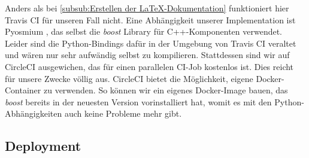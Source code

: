 Anders als bei \ref{subsub:Erstellen der LaTeX-Dokumentation} funktioniert hier Travis CI für unseren Fall nicht. Eine Abhängigkeit unserer Implementation ist Pyosmium \cite{pyosmium}, das selbst die \emph{boost} Library für C++-Komponenten verwendet. Leider sind die Python-Bindings dafür in der Umgebung von Travis CI veraltet und wären nur sehr aufwändig selbst zu kompilieren. Stattdessen sind wir auf CircleCI \cite{circleci} ausgewichen, das für einen parallelen \ac{CI}-Job kostenlos ist. Dies reicht für unsere Zwecke völlig aus. CircleCI bietet die Möglichkeit, eigene Docker-Container zu verwenden. So können wir ein eigenes Docker-Image bauen, das \emph{boost} bereits in der neuesten Version vorinstalliert hat, womit es mit den Python-Abhängigkeiten auch keine Probleme mehr gibt.

\subsection{Deployment}
\label{sub:Deployment}